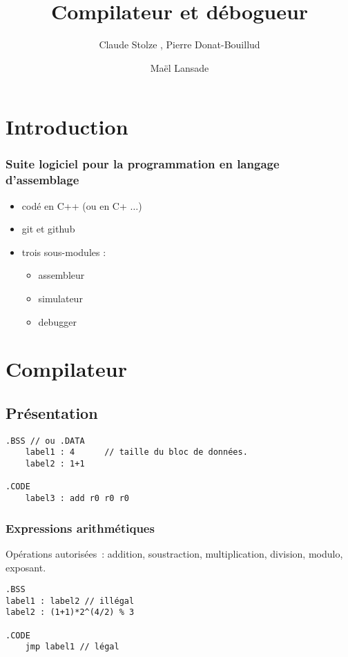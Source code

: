 \documentclass{beamer}
\title[Compilateur et débogueur] %
{Compilateur et débogueur}
\author[Claude Stolze, Pierre Donat-Bouillud, Maël Lansade]{Claude Stolze , Pierre Donat-Bouillud \and Maël Lansade}
\institute[ENS Cachan - Antenne de Bretagne]
\begin{document}
\begin{frame}
  \titlepage
\end{frame}


\section{Introduction}

\begin{frame}
	\frametitle{Suite logiciel pour la programmation en langage d'assemblage}
	\begin{itemize}
	\item codé en C++ (ou en C+ $\dots$)
	\item git et github
	\item trois sous-modules :
		\begin{itemize}
		\item assembleur
		\item simulateur
		\item debugger
		\end{itemize}
	\end{itemize}
\end{frame}

\section{Compilateur}
\subsection{Présentation}
\begin{frame}[fragile]
\begin{verbatim}
.BSS // ou .DATA
	label1 : 4		// taille du bloc de données.
	label2 : 1+1

.CODE
	label3 : add r0 r0 r0
\end{verbatim}
\end{frame}

\begin{frame}[fragile]
\frametitle{Expressions arithmétiques}
Opérations autorisées~: addition, soustraction, multiplication, division, modulo, exposant.
\begin{verbatim}
.BSS
label1 : label2 // illégal
label2 : (1+1)*2^(4/2) % 3

.CODE
	jmp label1 // légal
\end{verbatim}
\end{frame}
\end{document}
